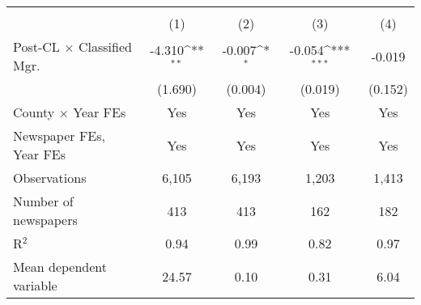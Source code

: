 {
\def\sym#1{\ifmmode^{#1}\else\(^{#1}\)\fi}
\begin{tabular}{l*{4}{c}}
\toprule
                    &&&&\\\cmidrule(lr){2-2}\cmidrule(lr){3-3}\cmidrule(lr){4-4}\cmidrule(lr){5-5}
                    &         &         &         &         \\
\midrule
Post-CL $\times$ Classified Mgr.&      -4.310\sym{**} &      -0.007\sym{*}  &      -0.054\sym{***}&      -0.019         \\
                    &     (1.690)         &     (0.004)         &     (0.019)         &     (0.152)         \\
\addlinespace
County $\times$ Year FEs &         Yes         &         Yes         &         Yes         &         Yes         \\
\addlinespace
Newspaper FEs, Year FEs &         Yes         &         Yes         &         Yes         &         Yes         \\
\midrule
Observations        &       6,105         &       6,193         &       1,203         &       1,413         \\
Number of newspapers&         413         &         413         &         162         &         182         \\
R$^2$               &        0.94         &        0.99         &        0.82         &        0.97         \\
Mean dependent variable&       24.57         &        0.10         &        0.31         &        6.04         \\
\bottomrule
\end{tabular}
}
